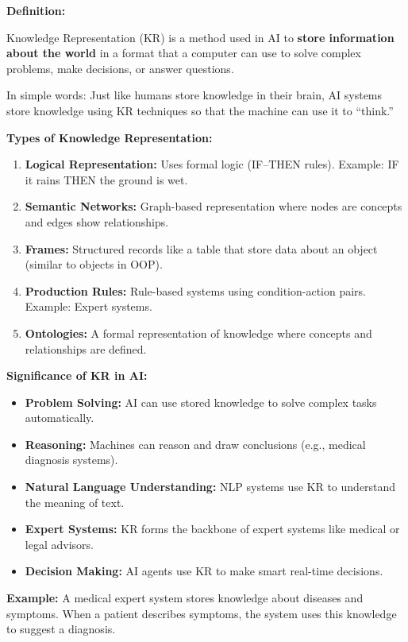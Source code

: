 \documentclass[12pt,a4paper]{article}
\newcommand{\term}[1]{\textbf{\color{headingcolor}#1}}
\begin{document}
\begin{answerenv}

\textbf{\color{headingcolor}Definition:}

Knowledge Representation (KR) is a method used in AI to \textbf{store information about the world} in a format that a computer can use to solve complex problems, make decisions, or answer questions.

In simple words: Just like humans store knowledge in their brain, AI systems store knowledge using KR techniques so that the machine can use it to ``think.''

\vspace{6pt}
\textbf{\color{headingcolor}Types of Knowledge Representation:}
\begin{enumerate}[leftmargin=1.8em, itemsep=3pt]
  \item \term{Logical Representation:} Uses formal logic (IF--THEN rules). Example: IF it rains THEN the ground is wet.
  \item \term{Semantic Networks:} Graph-based representation where nodes are concepts and edges show relationships.
  \item \term{Frames:} Structured records like a table that store data about an object (similar to objects in OOP).
  \item \term{Production Rules:} Rule-based systems using condition-action pairs. Example: Expert systems.
  \item \term{Ontologies:} A formal representation of knowledge where concepts and relationships are defined.
\end{enumerate}

\vspace{6pt}
\textbf{\color{headingcolor}Significance of KR in AI:}
\begin{itemize}[leftmargin=1.5em, itemsep=3pt]
  \item \term{Problem Solving:} AI can use stored knowledge to solve complex tasks automatically.
  \item \term{Reasoning:} Machines can reason and draw conclusions (e.g., medical diagnosis systems).
  \item \term{Natural Language Understanding:} NLP systems use KR to understand the meaning of text.
  \item \term{Expert Systems:} KR forms the backbone of expert systems like medical or legal advisors.
  \item \term{Decision Making:} AI agents use KR to make smart real-time decisions.
\end{itemize}

\begin{keypoint}
\textbf{Example:} A medical expert system stores knowledge about diseases and symptoms. When a patient describes symptoms, the system uses this knowledge to suggest a diagnosis.
\end{keypoint}

\end{answerenv}
\end{document}
